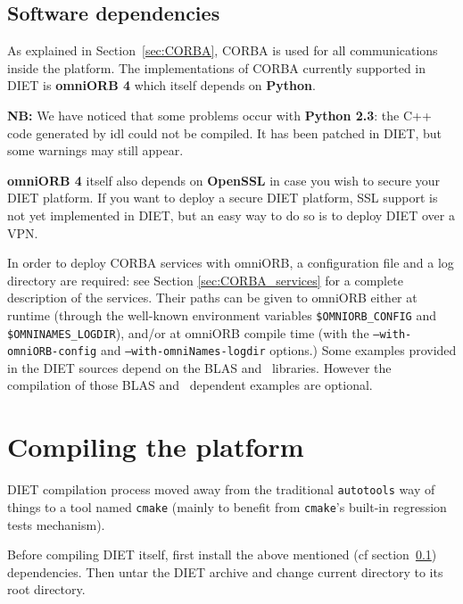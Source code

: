 \subsection{Software dependencies}
\label{sec:software_dependencies}

As explained in Section~\ref{sec:CORBA}, CORBA is used for all
communications inside the platform.
The implementations of CORBA currently supported in DIET is
\textbf{omniORB 4} which itself depends on \textbf{Python}.

\noindent 
\textbf{NB:} We have noticed that some problems occur with
\textbf{Python 2.3}: the C++ code generated by idl could not be compiled.
It has been patched in DIET, but some warnings may still appear.

\textbf{omniORB 4} itself also depends on \textbf{OpenSSL} in case
you wish to secure your DIET platform.
If you want to deploy a secure DIET platform, SSL support is not yet
implemented  in DIET, but an easy way to do so is to deploy DIET over
a VPN.

In order to deploy CORBA services with omniORB, a configuration file
and a log directory are required: see Section \ref{sec:CORBA_services}
for a complete description of the services.  Their paths can be given
to omniORB either at runtime (through the well-known environment
variables \texttt{\$OMNIORB\_CONFIG} and 
\texttt{\$OMNINAMES\_LOGDIR}), and/or at omniORB compile time (with 
the \linebreak\texttt{--with-omniORB-config} and \texttt{--with-omniNames-logdir} options.)
Some examples provided in the DIET sources depend on the BLAS
and \scalapack\ libraries. However the compilation of those BLAS and
\scalapack\ dependent examples are optional.

\section{Compiling the platform}
\label{sec:compil_platform}

DIET compilation process moved away from the traditional \verb+autotools+
way of things to a tool named \verb+cmake+ (mainly to benefit from
\verb+cmake+'s built-in regression tests mechanism).

Before compiling DIET itself, first install the above mentioned
(cf section~\ref{sec:software_dependencies}) dependencies.
Then untar the DIET archive and change current directory to its root directory.

